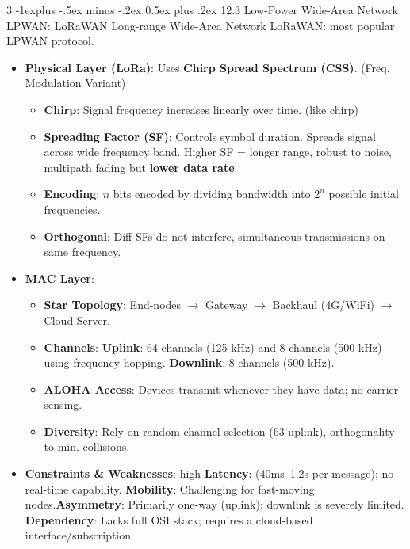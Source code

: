 \documentclass[a4paper, 9pt, landscape]{extarticle}
\makeatletter
\renewcommand{\subsection}{\@startsection{subsection}{2}{0mm}%
                                {-1explus -.5ex minus -.2ex}%
                                {0.5ex plus .2ex}%
                                {\normalfont\normalsize\bfseries}}
\makeatother
\begin{document}
\begin{multicols*}{3}
\subsection{12.3 Low-Power Wide-Area Network LPWAN: LoRaWAN}
Long-range Wide-Area Network LoRaWAN: most popular LPWAN protocol.
\begin{itemize}
    \item \textbf{Physical Layer (LoRa)}: Uses \textbf{Chirp Spread Spectrum (CSS)}. (Freq. Modulation Variant)
    \begin{itemize}
      \item \textbf{Chirp}: Signal frequency increases linearly over time. (like chirp)
      \item \textbf{Spreading Factor (SF)}: Controls symbol duration. Spreads signal across wide frequency band. Higher SF = longer range, robust to noise, multipath fading but \textbf{lower data rate}.
      \item \textbf{Encoding}: $n$ bits encoded by dividing bandwidth into $2^n$ possible initial frequencies.
      \item \textbf{Orthogonal}: Diff SFs do not interfere, simultaneous transmissions on same frequency.
    \end{itemize}
    \item \textbf{MAC Layer}: 
    \begin{itemize}
      \item \textbf{Star Topology}: End-nodes $\rightarrow$ Gateway $\rightarrow$ Backhaul (4G/WiFi) $\rightarrow$ Cloud Server.
      \item \textbf{Channels}: \textbf{Uplink}: 64 channels (125 kHz) and 8 channels (500 kHz) using frequency hopping. \textbf{Downlink}: 8 channels (500 kHz).
      \item \textbf{ALOHA Access}: Devices transmit whenever they have data; no carrier sensing.
      \item \textbf{Diversity}: Rely on random channel selection (63 uplink), orthogonality to min. collisions.
    \end{itemize}
    \item \textbf{Constraints \& Weaknesses}: high \textbf{Latency}: (40ms--1.2s per message); no real-time capability. \textbf{Mobility}: Challenging for fast-moving nodes.\textbf{Asymmetry}: Primarily one-way (uplink); downlink is severely limited. \textbf{Dependency}: Lacks full OSI stack; requires a cloud-based interface/subscription.
\end{itemize}


\end{multicols*}
\end{document}
